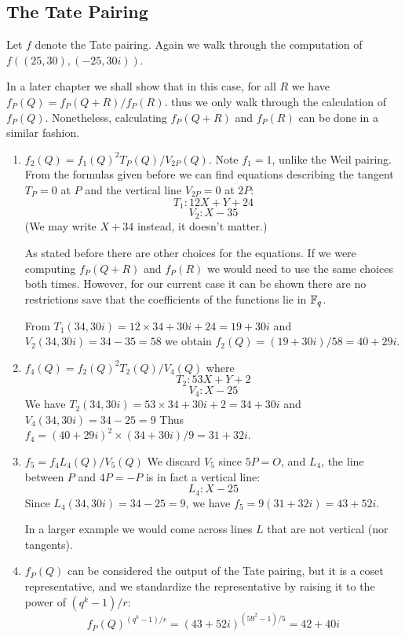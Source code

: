 \subsection {The Tate Pairing}

Let $f$ denote the Tate pairing.
Again we walk through the computation of
$f((25,30), (-25,30i))$.

In a later chapter we shall show that in this case,
for all $R$ we have $f_P(Q) = f_P(Q+R)/f_P(R)$.
thus we only walk through the calculation of
$f_P(Q)$.
Nonetheless, calculating $f_P(Q+R)$ and $f_P(R)$ can be done in
a similar fashion.

\begin{enumerate}
\item
$f_2(Q) = f_1(Q)^2 T_P (Q) / V_{2P}(Q)$.
Note $f_1 = 1$, unlike the Weil pairing.
From the formulas given before we can find equations describing
the tangent $T_P = 0$ at $P$ and the vertical line $V_{2P} = 0$ at $2P$:
\[ T_1 : 12 X + Y + 24 \]
\[ V_2 : X - 35 \]
(We may write $X + 34$ instead, it doesn't matter.)

As stated before there are other choices for the equations.
If we were computing $f_P(Q+R)$ and $f_P(R)$ we would need
to use the same choices both times. However, for our current case it
can be shown
there are no restrictions save that the coefficients of the functions
lie in $\mathbb{F}_q$.

From
$T_1(34, 30i) = 12 \times 34 + 30i + 24 = 19 + 30i$ and
$V_2(34, 30i) = 34 - 35 = 58$
we obtain $f_2(Q) = (19 + 30i) / 58 =  40 + 29i$.
\item
$f_4(Q) = f_2(Q) ^2 T_2 (Q) / V_4(Q)$ where
\[ T_2 : 53 X + Y + 2 \]
\[ V_4 : X - 25 \]
We have
$T_2(34,30i) = 53 \times 34 + 30i + 2 = 34 + 30i$ and
$V_4(34,30i) = 34 - 25 = 9$ Thus
$f_4 = (40 + 29i)^2 \times (34+30i) / 9 = 31 + 32i$.
\item
$f_5 = f_4 L_4(Q) / V_5(Q)$
We discard $V_5$ since $5P = O$, and $L_4$, the line between $P$ and $4P = -P$
is in fact a vertical line:
\[ L_4: X - 25 \]
Since
$L_4(34, 30i) = 34 - 25 = 9$, we have
$f_5 = 9(31 + 32i) = 43 + 52i$.

In a larger example we would
come across lines $L$ that are not vertical (nor tangents).
\item
$f_P(Q)$ can be considered the output of the Tate pairing,
but it is a coset representative, and we standardize the representative
by raising it to the power of $(q^k - 1)/r$:
\[ f_P(Q)^{(q^k-1)/r} = (43+52i)^{(59^2 - 1)/5} = 42+40i \]
\end{enumerate}

